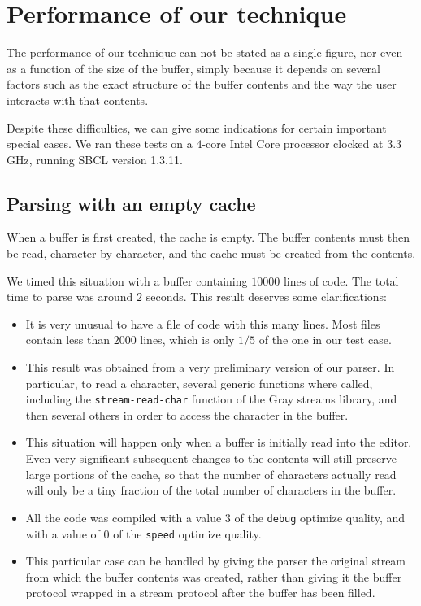 \section{Performance of our technique}

The performance of our technique can not be stated as a single figure,
nor even as a function of the size of the buffer, simply because it
depends on several factors such as the exact structure of the buffer
contents and the way the user interacts with that contents.

Despite these difficulties, we can give some indications for certain
important special cases.  We ran these tests on a $4$-core Intel Core
processor clocked at $3.3$GHz, running SBCL version 1.3.11.

\subsection{Parsing with an empty cache}

When a buffer is first created, the cache is empty.  The buffer
contents must then be read, character by character, and the cache must
be created from the contents.

We timed this situation with a buffer containing $10000$ lines of
\commonlisp{} code.  The total time to parse was around $2$ seconds.
This result deserves some clarifications:

\begin{itemize}
\item It is very unusual to have a file of \commonlisp{} code with
  this many lines.  Most files contain less than $2000$ lines, which
  is only $1/5$ of the one in our test case.
\item This result was obtained from a very preliminary version of our
  parser.  In particular, to read a character, several generic
  functions where called, including the \texttt{stream-read-char}
  function of the Gray streams library, and then several others in
  order to access the character in the buffer.
\item This situation will happen only when a buffer is initially read
  into the editor.  Even very significant subsequent changes to the
  contents will still preserve large portions of the cache, so that
  the number of characters actually read will only be a tiny fraction
  of the total number of characters in the buffer.
\item All the code was compiled with a value $3$ of the \texttt{debug}
  optimize quality, and with a value of $0$ of the \texttt{speed}
  optimize quality.
\item This particular case can be handled by giving the parser the
  original stream from which the buffer contents was created, rather
  than giving it the buffer protocol wrapped in a stream protocol
  after the buffer has been filled.
\end{itemize}

